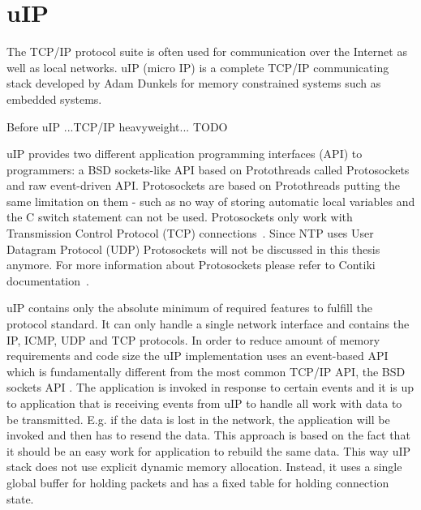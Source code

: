 
\section{uIP}\label{sec:contiki-uip}
The TCP/IP protocol suite is often used for communication over the Internet as well as local networks.
uIP (micro IP) is a complete TCP/IP communicating stack developed by Adam Dunkels
for memory constrained systems such as embedded systems.

Before uIP ...TCP/IP heavyweight...
\! TODO

uIP provides two different application programming interfaces (API) to programmers:
a BSD sockets-like API based on Protothreads called Protosockets and raw event-driven API.
Protosockets are based on Protothreads putting the same limitation on them - such as 
no way of storing automatic local variables and the C switch statement can not be used.
Protosockets only work with Transmission Control Protocol (TCP) connections~\cite{contiki-docs}.
Since NTP uses User Datagram Protocol (UDP) Protosockets will not be
discussed in this thesis anymore. For more information about Protosockets
please refer to Contiki documentation~\cite{contiki-docs}.

uIP contains only the absolute minimum of required features to fulfill the protocol standard.
It can only handle a single network interface and contains the IP, ICMP, UDP and TCP protocols.
In order to reduce amount of memory requirements and code size the
uIP implementation uses an event-based API which is fundamentally different
from the most common TCP/IP API, the BSD sockets API \cite{thesis-programming}.
The application is invoked in response to certain events and
it is up to application that is receiving events from uIP to handle all
work with data to be transmitted. E.g. if the data is lost in the network,
the application will be invoked and then has to resend the data.
This approach is based on the fact that it should be an easy work for application
to rebuild the same data.
This way uIP stack does not use explicit dynamic memory allocation.
Instead, it uses a single global buffer for holding packets and has a fixed
table for holding connection state.

